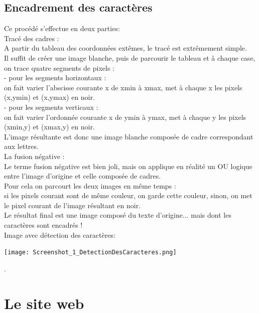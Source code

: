 \documentclass [french,12pt]{article}
\begin{document}
\subsection{Encadrement des caractères}

Ce procédé s'effectue en deux parties:
\\
Tracé des cadres :
\\
		A partir du tableau des coordonnées extêmes, le tracé est extrêmement simple.
\\
		Il suffit de créer une image blanche, puis de parcourir le tableau et à chaque case, on trace quatre segments de pixels :
\\
- pour les segments horizontaux :
\\
			on fait varier l'abscisse courante x de xmin à xmax,
			met à chaque x les pixels (x,ymin) et (x,ymax) en noir.
\\
- pour les segments verticaux :
\\
on fait varier l'ordonnée courante x de ymin à ymax,
met à chaque y les pixels (xmin,y) et (xmax,y) en noir.
\\
		L'image résultante est donc une image blanche composée de cadre correspondant aux lettres.
\\
La fusion négative :
\\
		Le terme fusion négative est bien joli, mais on applique en réalité un OU logique 	entre l'image d'origine et celle composée de cadres.
\\
           Pour cela on parcourt les deux images en même temps :
\\
                    si les pixels courant sont de même couleur, on garde cette couleur,
                    sinon, on met le pixel courant de l'image résultant en noir.
\\
		Le résultat final est une image composé du texte d'origine... mais dont les caractères sont encadrés !
\\
Image avec détection des caractères:
\\
\begin{center} \texttt{[image: Screenshot\_1\_DetectionDesCaracteres.png]} \end{center}.
\\

\section{Le site web}
\end{document}
